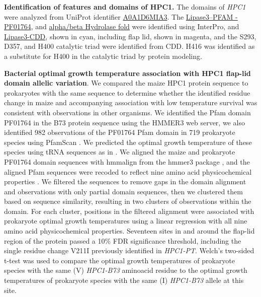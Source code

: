 \documentclass[9pt,twocolumn,twoside,lineno]{biorxiv}
\begin{document}
\textbf{Identification of features and domains of HPC1.}
The domains of \textit{HPC1} were analyzed from UniProt identifier \hyperlink{https://www.uniprot.org/uniprot/A0A1D6MIA3}{A0A1D6MIA3}. 
The \hyperlink{https://www.ebi.ac.uk/interpro/entry/pfam/PF01764/}{Lipase3--PFAM - PF01764}, and \hyperlink{https://www.ebi.ac.uk/interpro/entry/InterPro/IPR029058/}{alpha/beta Hydrolase fold} were identified using InterPro, and \hyperlink{https://www.ncbi.nlm.nih.gov/Structure/cdd/cddsrv.cgi?uid=cd00519}{Lipase3-CDD}, shown in cyan, including flap lid, shown in magenta, and the S293, D357, and H400 catalytic triad were identified from CDD. 
H416 was identified as a substitute for H400 in the catalytic triad by protein modeling.

\textbf{Bacterial optimal growth temperature association with HPC1 flap-lid domain allelic variation}.
We compared the maize HPC1 protein sequence to prokaryotes with the same sequence to determine whether the identified residue change in maize and accompanying association with low temperature survival was consistent with observations in other organisms. 
We identified the Pfam domain PF01764 in the B73 protein sequence using the HMMER3 web server, we also identified 982 observations of the PF01764 Pfam domain in 719 prokaryote species using PfamScan \cite{Potter2018-tk, El-Gebali2019-pw}. 
We predicted the optimal growth temperature of these species using tRNA sequences as in \cite{Cimen2020-dm}. 
We aligned the maize and prokaryote PF01764 domain sequences with hmmalign from the hmmer3 package \cite{Eddy2011-pd}, and the aligned Pfam sequences were recoded to reflect nine amino acid physicochemical properties \cite{Li2016-ut}. 
We filtered the sequences to remove gaps in the domain alignment and observations with only partial domain sequences, then we clustered them based on sequence similarity, resulting in two clusters of observations within the domain. 
For each cluster, positions in the filtered alignment were associated with prokaryote optimal growth temperatures using a linear regression with all nine amino acid physicochemical properties. 
Seventeen sites in and around the flap-lid region of the protein passed a 10\% FDR significance threshold, including the single residue change V211I previously identified in \textit{HPC1-PT}. 
Welch’s two-sided t-test was used to compare the optimal growth temperatures of prokaryote species with the same (V) \textit{HPC1-B73} aminoacid residue to the optimal growth temperatures of prokaryote species with the same (I) \textit{HPC1-B73} allele at this site.
\end{document}
